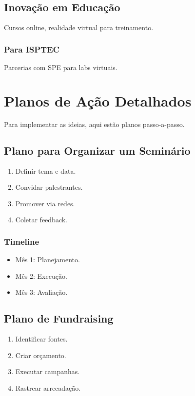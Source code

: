 \documentclass[12pt]{article}
\begin{document}
\subsection{Inovação em Educação}
Cursos online, realidade virtual para treinamento.

\subsubsection{Para ISPTEC}
Parcerias com SPE para labs virtuais.

\newpage

\section{Planos de Ação Detalhados}

Para implementar as ideias, aqui estão planos passo-a-passo.

\subsection{Plano para Organizar um Seminário}
\begin{enumerate}
    \item Definir tema e data.
    \item Convidar palestrantes.
    \item Promover via redes.
    \item Coletar feedback.
\end{enumerate}

\subsubsection{Timeline}
\begin{itemize}
    \item Mês 1: Planejamento.
    \item Mês 2: Execução.
    \item Mês 3: Avaliação.
\end{itemize}

\subsection{Plano de Fundraising}
\begin{enumerate}
    \item Identificar fontes.
    \item Criar orçamento.
    \item Executar campanhas.
    \item Rastrear arrecadação.
\end{enumerate}
\end{document}
